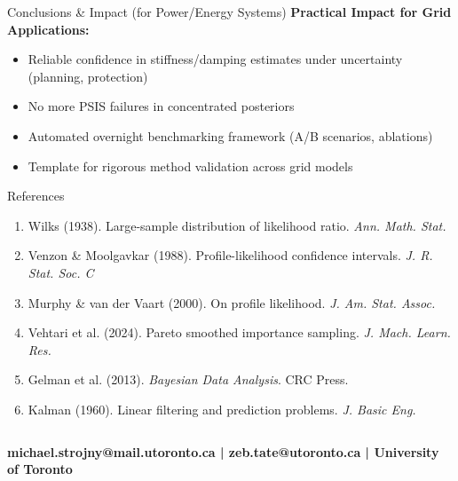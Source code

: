 \documentclass[final,hyperref={pdfpagelabels=false}]{beamer}
\begin{document}
\begin{frame}[t]
\begin{columns}[t,totalwidth=\textwidth]
\begin{column}{0.32\textwidth}
\begin{alertblock}{Conclusions \& Impact (for Power/Energy Systems)}
\textbf{Practical Impact for Grid Applications:}
\begin{itemize}
\item Reliable confidence in stiffness/damping estimates under uncertainty (planning, protection)
\item No more PSIS failures in concentrated posteriors  
\item Automated overnight benchmarking framework (A/B scenarios, ablations)
\item Template for rigorous method validation across grid models
\end{itemize}

\end{alertblock}

\begin{block}{\small References}
\tiny
\begin{enumerate}
\item Wilks (1938). Large-sample distribution of likelihood ratio. \textit{Ann. Math. Stat.}
\item Venzon \& Moolgavkar (1988). Profile-likelihood confidence intervals. \textit{J. R. Stat. Soc. C}
\item Murphy \& van der Vaart (2000). On profile likelihood. \textit{J. Am. Stat. Assoc.}
\item Vehtari et al. (2024). Pareto smoothed importance sampling. \textit{J. Mach. Learn. Res.}
\item Gelman et al. (2013). \textit{Bayesian Data Analysis}. CRC Press.
\item Kalman (1960). Linear filtering and prediction problems. \textit{J. Basic Eng.}
\end{enumerate}
\end{block}

\end{column}

\end{columns}

\vspace{1cm}
\begin{center}
\Large \textcolor{UTblue}{\textbf{michael.strojny@mail.utoronto.ca | zeb.tate@utoronto.ca | University of Toronto}}
\end{center}

\end{frame}
\end{document}
